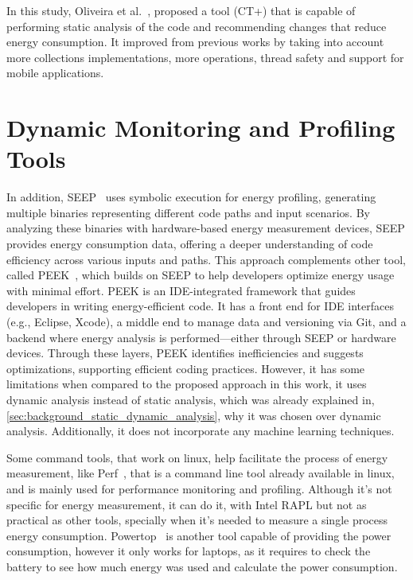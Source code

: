 In this study, Oliveira et al.~\cite{8816747}, proposed a tool (CT+) that is capable of performing static analysis of the code and recommending changes that reduce energy consumption. It improved from previous works by taking into account more collections implementations, more operations, thread safety and support for mobile applications. 


\section{Dynamic Monitoring and Profiling Tools}

In addition, SEEP~\cite{10.1145/2094091.2094106} uses symbolic execution for energy profiling, generating multiple binaries representing different code paths and input scenarios. By analyzing these binaries with hardware-based energy measurement devices, SEEP provides energy consumption data, offering a deeper understanding of code efficiency across various inputs and paths. This approach complements other tool, called PEEK~\cite{187026}, which builds on SEEP to help developers optimize energy usage with minimal effort. PEEK is an IDE-integrated framework that guides developers in writing energy-efficient code. It has a front end for IDE interfaces (e.g., Eclipse, Xcode), a middle end to manage data and versioning via Git, and a backend where energy analysis is performed—either through SEEP or hardware devices. Through these layers, PEEK identifies inefficiencies and suggests optimizations, supporting efficient coding practices. However, it has some limitations when compared to the proposed approach in this work, it uses dynamic analysis instead of static analysis, which was already explained in, \ref{sec:background_static_dynamic_analysis}, why it was chosen over dynamic analysis. Additionally, it does not incorporate any machine learning techniques.

Some command tools, that work on linux, help facilitate the process of energy measurement, like Perf~\cite{perfwiki_main}, that is a command line tool already available in linux, and is mainly used for performance monitoring and profiling. Although it's not specific for energy measurement, it can do it, with Intel RAPL but not as practical as other tools, specially when it's needed to measure a single process energy consumption. Powertop~\cite{archlinux_Powertop} is another tool capable of providing the power consumption, however it only works for laptops, as it requires to check the battery to see how much energy was used and calculate the power consumption.


